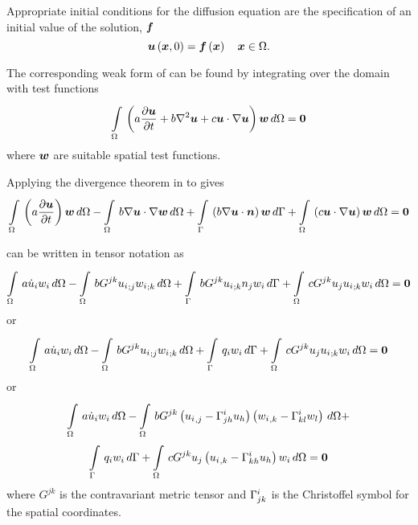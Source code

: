 Appropriate initial conditions for the diffusion equation are the
specification of an initial value of the solution, $\vect{f}$ \ie
\begin{equation}
  \fnof{\vect{u}}{\vect{x},0} = \fnof{\vect{f}}{\vect{x}} \quad \vect{x}\in\Omega.
  \label{eqn:BurgersInitialC} 
\end{equation}


The corresponding weak form of  can be
found by integrating over the domain with test functions \ie
\begin{equation}
  \gint{\Omega}{}{\pbrac{a\delby{\vect{u}}{t}+
      b\laplacian{\vect{u}}+
      c\dotprod{\vect{u}}{\gradient{}{\vect{u}}}}\vect{w}}{\Omega}=\vect{0}
  \label{eqn:Burgersweakform1}
\end{equation}
where $\vect{w}$ are suitable spatial test functions.

Applying the divergence theorem in  to  gives
\begin{equation}
  \gint{\Omega}{}{\pbrac{a\delby{\vect{u}}{t}}\vect{w}}{\Omega}-
      \gint{\Omega}{}{b\dotprod{\gradient{}{\vect{u}}}{\gradient{}{\vect{w}}}}{\Omega}
      +\gint{\Gamma}{}{\pbrac{b\dotprod{\gradient{}{\vect{u}}}{\normal}}\vect{w}}{\Gamma}+
      \gint{\Omega}{}{\pbrac{c\dotprod{\vect{u}}{\gradient{}{\vect{u}}}}\vect{w}}{\Omega}
      =\vect{0}
  \label{eqn:Burgersweakform2}
\end{equation}


 can be written in tensor notation as
\begin{equation}
  \gint{\Omega}{}{a\dot{u}_{i}w_{i}}{\Omega}-
  \gint{\Omega}{}{bG^{jk}\covarderiv{u_{i}}{j}\covarderiv{w_{i}}{k}}{\Omega}+
  \gint{\Gamma}{}{bG^{jk}\covarderiv{u_{i}}{k}n_{j}w_{i}}{\Gamma} +
  \gint{\Omega}{}{cG^{jk}u_{j}\covarderiv{u_{i}}{k}w_{i}}{\Omega}=\vect{0}
  \label{eqn:Burgerstensorform1}
\end{equation}
or
\begin{equation}
  \gint{\Omega}{}{a\dot{u}_{i}w_{i}}{\Omega}-
  \gint{\Omega}{}{bG^{jk}\covarderiv{u_{i}}{j}\covarderiv{w_{i}}{k}}{\Omega}+
  \gint{\Gamma}{}{q_{i}w_{i}}{\Gamma} +
  \gint{\Omega}{}{cG^{jk}u_{j}\covarderiv{u_{i}}{k}w_{i}}{\Omega}=\vect{0}
  \label{eqn:Burgerstensorform2}
\end{equation}
or
\begin{multline}
  \gint{\Omega}{}{a\dot{u}_{i}w_{i}}{\Omega}-
  \gint{\Omega}{}{bG^{jk}\pbrac{\partialderiv{u_{i}}{j}-\christoffel{i}{j}{h}u_{h}}
    \pbrac{\partialderiv{w_{i}}{k}-\christoffel{i}{k}{l}w_{l}}}{\Omega}+ \\
  \gint{\Gamma}{}{q_{i}w_{i}}{\Gamma} +
  \gint{\Omega}{}{cG^{jk}u_{j}\pbrac{\partialderiv{u_{i}}{k}-
      \christoffel{i}{k}{h}u_{h}}w_{i}}{\Omega}=\vect{0}
  \label{eqn:Burgerstensorform3}
\end{multline}
where $G^{jk}$ is the contravariant metric tensor and $ \Gamma^{i}_{jk} $
is the Christoffel symbol for the spatial coordinates.

